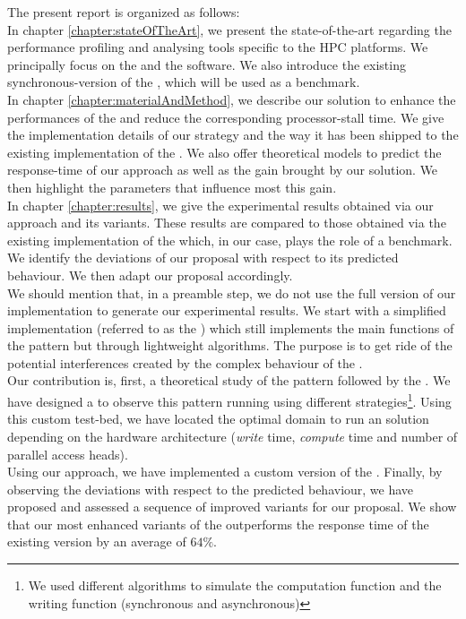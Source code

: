 	The present report is organized as follows:\\
	In chapter \ref{chapter:stateOfTheArt}, we present the state-of-the-art regarding the performance profiling and analysing tools specific to the HPC platforms.   We principally focus on the \toolTraceAnalyzed\space and the \toolProfiling\space software.   We also introduce the existing synchronous-\notationIO\space version of the \toolTargetSoftware, which will be used as a benchmark.\\
	In chapter \ref{chapter:materialAndMethod}, we describe our solution to enhance the performances of the \toolTargetSoftware\space and reduce the corresponding processor-stall time.   We give the implementation details of our \notationaio\space strategy and the way it has been shipped to the existing implementation of the \toolTargetSoftware.   We also offer theoretical models to predict the response-time of our approach as well as the gain brought by our solution.   We then highlight the parameters that influence most this gain.\\
	In chapter \ref{chapter:results}, we give the experimental results obtained via our approach and its variants.   These results are compared to those obtained via the existing implementation of the \toolTargetSoftware\space which, in our case, plays the role of a benchmark.   We identify the deviations of our proposal with respect to its predicted behaviour. We then adapt our proposal accordingly.\\
	We should mention that, in a preamble step, we do not use the full version of our implementation to generate our experimental results.   We start with a simplified implementation (referred to as the \toolSimulationSoftware) which still implements the main functions of the pattern but through lightweight algorithms.   The purpose is to get ride of the potential interferences created by the complex behaviour of the \toolTargetSoftware.\\

	Our contribution is, first, a theoretical study of the pattern followed by the \toolTargetSoftware.   We have designed a \toolSimulationSoftware\space to observe this pattern running using different strategies\footnote{We used different algorithms to simulate the computation function and the writing function (synchronous and asynchronous)}.   Using this custom test-bed, we have located the optimal domain to run an \notationaio\space solution depending on the hardware architecture (\notationIO\space \emph{write} time, \emph{compute} time and number of parallel \notationIO\space access heads).\\
	Using our \notationaio\space approach, we have implemented a custom version of the \toolTargetSoftware.   Finally, by observing the deviations with respect to the predicted behaviour, we have proposed and assessed a sequence of improved variants for our proposal.   We show that our most enhanced variants of the \toolTargetSoftware\space outperforms the response time of the existing version by an average of $64\%$.\\

